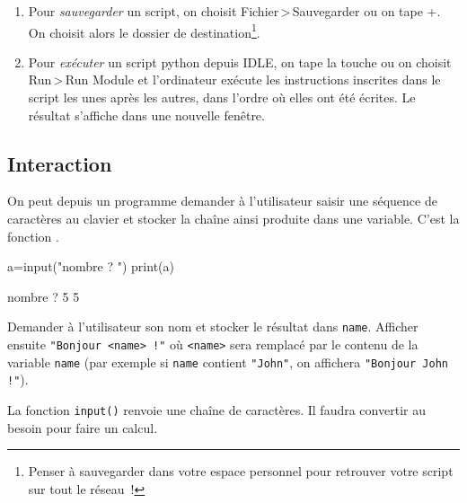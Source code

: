 {\begin{enumerate}
En règle générale, on fait commencer un script Python par cette ligne~:
\begin{pythoncode}
# -*- coding:utf8 -*-
\end{pythoncode}

Cette ligne \label{python:variables:encodage}indique à la machine quel est l'encodage utilisé
pour écrire le script, c'est-à-dire le type de représentation numérique de chaque caractère
\footnote{Pour plus d'informations sur le codage des caractères,
voir \url{http://fr.wikipedia.org/wiki/Codage_de_caract\%C3\%A8res}.}.

Même si elle est utile, cette ligne est optionnelle et n'est pas nécessaire à la bonne
exécution du script.

\item Pour \textit{sauvegarder} un script, on choisit \textsf{Fichier\,>\,Sauvegarder} ou on tape
+. On choisit alors le dossier de destination\footnote{Penser à sauvegarder
dans votre espace personnel pour retrouver votre script sur tout le réseau~!}.

\item Pour \textit{exécuter} un script python depuis IDLE, on tape la touche  ou on choisit
\textsf{Run\,>\,Run Module} et l'ordinateur exécute les instructions inscrites dans le script
les unes après les autres, dans l'ordre où elles ont été écrites. Le résultat s'affiche dans une
nouvelle fenêtre.
\end{enumerate}

\subsection{Interaction}
On peut depuis un programme demander à l'utilisateur saisir une séquence de caractères au clavier
et stocker la chaîne ainsi produite dans une variable. C'est la fonction .

\begin{multicols}{2}
\begin{pythonexemple}
a=input("nombre ? ")
print(a)
\end{pythonexemple}

\begin{result}
nombre ? 5
5
\end{result}
\end{multicols}

\begin{exercice}
Demander à l'utilisateur son nom et stocker le résultat dans \texttt{name}.
Afficher ensuite \texttt{"Bonjour <name> !"} où \texttt{<name>} sera remplacé par le contenu de la
variable \texttt{name} (par exemple si \texttt{name} contient \texttt{"John"}, on affichera
\texttt{"Bonjour John !"}).
\end{exercice}
\begin{remarque}
La fonction \texttt{input()} renvoie une chaîne de caractères. Il faudra convertir au besoin pour
faire un calcul.


\end{remarque}}

